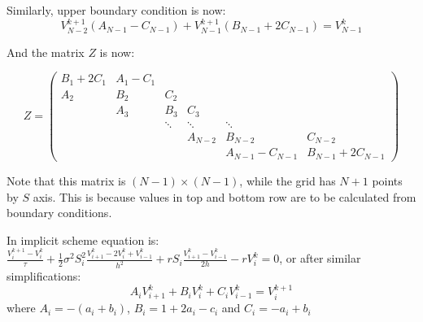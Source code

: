 \documentclass[11pt]{article} %
\begin{document}
Similarly, upper boundary condition is now:
\begin{equation}
V_{N-2}^{k+1} \left(A_{N-1} - C_{N-1} \right)+ V_{N-1}^{k+1} \left( B_{N-1} + 2C_{N-1} \right)=V_{N-1}^{k}
\end{equation}

And the matrix $Z$ is now:


\begin{equation}
Z = 
\begin{pmatrix}
B_1 + 2C_1		& 	A_1 - C_1 	& 	  		& 		 	& 		 				& 						\\
A_2 			& 	B_2 		& 	 C_2	& 		 	& 		 				& 					 	\\
	 			& 	A_3			& 	 B_3 	& C_3	 	& 		 				& 						\\
 				& 		 		& \ddots 	& \ddots 	& 	\ddots 				& 	 					\\
 				& 		 		& 		 	& A_{N-2} 	& 	B_{N-2}				& 	C_{N-2}				\\
 				& 		 		& 		 	& 		 	& 	A_{N-1} - C_{N-1}	& 	B_{N-1} + 2C_{N-1} 	
\end{pmatrix}
\end{equation} 

Note that this matrix is $(N-1) \times (N-1)$, while the grid has $N+1$ points by $S$ axis. This is because values in top and bottom row are to be calculated from boundary conditions.

In implicit scheme equation is:\\
$\frac{V_i^{k+1}-V_i^k}{\tau} + \frac{1}{2}\sigma^2 S_i^2 \frac{V_{i+1}^{k}-2V_{i}^{k}+V_{i-1}^{k}}{h^2} + r S_i \frac{V_{i+1}^{k}-V_{i-1}^{k}}{2h}-r V_{i}^{k}= 0$, or after similar simplifications:\\
\begin{equation}\label{eq:FDM_implicit}
A_i V_{i+1}^{k} + B_i V_{i}^{k}+C_iV_{i-1}^{k}=V_{i}^{k+1}
\end{equation}
where $A_i = -(a_i + b_i)$, $B_i = 1+2a_i - c_i$ and $C_i = -a_i+b_i$ 
\end{document}
